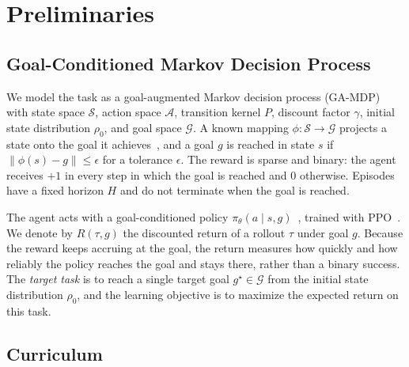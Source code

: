 \section{Preliminaries}\label{sec:preliminaries}


\subsection{Goal-Conditioned Markov Decision Process}\label{sec:problem_formulation}

We model the task as a goal-augmented Markov decision process (GA-MDP)~\citep{liu2022goal} with state space $\mathcal{S}$, action space $\mathcal{A}$, transition kernel $P$, discount factor $\gamma$, initial state distribution $\rho_0$, and goal space $\mathcal{G}$.
A known mapping $\phi: \mathcal{S} \to \mathcal{G}$ projects a state onto the goal it achieves~\citep{andrychowicz2017hindsight}, and a goal $g$ is reached in state $s$ if $\lVert \phi(s) - g \rVert \le \epsilon$ for a tolerance $\epsilon$.
The reward is sparse and binary: the agent receives $+1$ in every step in which the goal is reached and $0$ otherwise. Episodes have a fixed horizon $H$ and do not terminate when the goal is reached.

The agent acts with a goal-conditioned policy $\pi_\theta(a \mid s, g)$~\citep{schaul2015universal}, trained with PPO~\citep{schulman2017proximal}.
We denote by $R(\tau, g)$ the discounted return of a rollout $\tau$ under goal $g$. Because the reward keeps accruing at the goal, the return measures how quickly and how reliably the policy reaches the goal and stays there, rather than a binary success.
The \emph{target task} is to reach a single target goal $g^\star \in \mathcal{G}$ from the initial state distribution $\rho_0$, and the learning objective is to maximize the expected return on this task.

\subsection{Curriculum}\label{sec:curriculum}

